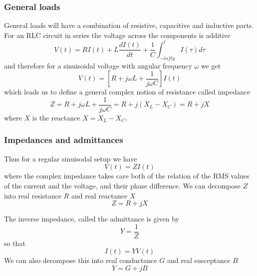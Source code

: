 \documentclass[10pt,dvipsnames]{beamer}
\begin{document}
\begin{frame}
  \frametitle{General loads}

  General loads will have a combination of resistive, capacitive and
  inductive parts. For an RLC circuit in series the voltage across the
  components is additive
  \begin{equation*}
    V(t) = R I(t) + L\frac{dI(t)}{dt} + \frac{1}{C} \int_{-infty}^t I(\tau) d\tau
  \end{equation*}
  and therefore for a sinuisoidal voltage with angular frequency $\omega$ we get
  \begin{equation*}
    V(t) = \left[ R + j\omega L + \frac{1}{j\omega C} \right] I(t)
  \end{equation*}
  which leads us to define a general complex notion of resistance called \alert{impedance}
  \begin{equation*}
    Z =  R + j\omega L + \frac{1}{j\omega C} = R + j(X_L - X_C) = R + jX
  \end{equation*}
  where $X$ is the reactance $X = X_L - X_C$.
\end{frame}


\begin{frame}
  \frametitle{Impedances and admittances}

  Thus for a regular sinuisodal setup we have
  \begin{equation*}
    V(t) = ZI(t)
  \end{equation*}
  where the complex \alert{impedance} takes care both of the relation
  of the RMS values of the current and the voltage, and their phase
  difference. We can decompose $Z$ into real resistance $R$ and real reactance $X$
  \begin{equation*}
    Z = R + jX
  \end{equation*}

  The inverse impedance, called the \alert{admittance} is given by
  \begin{equation*}
    Y = \frac{1}{Z}
  \end{equation*}
  so that
  \begin{equation*}
    I(t) = Y V(t)
  \end{equation*}
  We can also decompose this into real conductance $G$ and real susceptance $B$
  \begin{equation*}
    Y = G + jB
  \end{equation*}


\end{frame}
\end{document}
